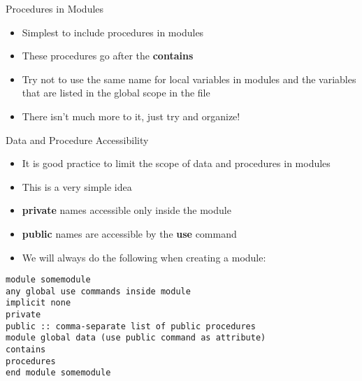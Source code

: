 \documentclass{beamer}
\begin{document}
\begin{frame}{Procedures in Modules}

  \begin{itemize}
    \item Simplest to include procedures in modules 
    \item These procedures go after the \textbf{contains}
    \item Try not to use the same name for local variables in modules and the variables that are listed in the global scope in the file
    \item There isn't much more to it, just try and organize!
  \end{itemize}

\end{frame}
\begin{frame}{Data and Procedure Accessibility}

  \begin{itemize}
    \item It is good practice to limit the scope of data and procedures in modules
    \item This is a very simple idea
    \item \textbf{private} names accessible only inside the module
    \item \textbf{public} names are accessible by the \textbf{use} command
    \item We will always do the following when creating a module:
  \end{itemize}
  \vfill
  \scriptsize
  \texttt{module somemodule} \\
    \hspace{0.1cm} \texttt{any global use commands inside module} \\
    \hspace{0.1cm} \texttt{implicit none} \\
    \hspace{0.1cm} \texttt{private} \\
    \hspace{0.1cm} \texttt{public ::  comma-separate list of public procedures} \\
    \hspace{0.1cm} \texttt{module global data (use public command as attribute)} \\
  \texttt{contains} \\
    \hspace{0.1cm} \texttt{procedures} \\
  \texttt{end module somemodule}

\end{frame}
\end{document}
